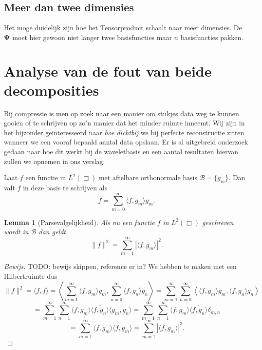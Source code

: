 \documentclass[11pt]{uvamath}
\theoremstyle{plain}
\newtheorem{lemm}[stelling]{Lemma}
\theoremstyle{definition}
\theoremstyle{remark}
\begin{document}
\subsection{Meer dan twee dimensies}
Het moge duidelijk zijn hoe het Tensorproduct schaalt naar meer dimensies. De $\boldsymbol\Psi$ moet hier gewoon niet langer twee basisfuncties maar $n$ basisfuncties pakken. 

\section{Analyse van de fout van beide decomposities}

Bij compressie is men op zoek naar een manier om stukjes data weg te kunnen gooien of te schrijven op zo'n manier dat het minder ruimte inneemt. Wij zijn in het bijzonder ge\"interesseerd naar \emph{hoe dichtbij} we bij perfecte reconstructie zitten wanneer we een vooraf bepaald aantal data opslaan. Er is al uitgebreid onderzoek gedaan naar hoe dit werkt bij de waveletbasis en een aantal resultaten hiervan zullen we opnemen in ons verslag.

Laat $f$ een functie in $L^2(\Box)$ met aftelbare orthonormale basis $\mathcal{B} = \{ g_m \}$. Dan valt $f$ in deze basis te schrijven als
\[
f = \sum_{m = 0}^\infty \langle f, g_m \rangle g_m.
\]

\begin{lemm}[Parsevalgelijkheid\cite{parseval}]
  Als nu een functie $f$ in $L^2(\Box)$ geschreven wordt in $\mathcal{B}$ dan geldt
  \[
  \|f\|^2 = \sum_{m=1}^\infty | \langle f, g_m \rangle |^2.
  \]
\end{lemm}
\begin{proof}[Bewijs]
  TODO: bewijs skippen, reference er in?
  We hebben te maken met een Hilbertruimte dus
  \[
  \|f\|^2 = \langle f, f \rangle = \left\langle \sum_{m=1}^\infty \langle f, g_m \rangle g_m, \sum_{n=0}^\infty \langle f, g_n \rangle g_n \right\rangle = \sum_{m=1}^\infty \sum_{n=0}^\infty \left\langle \langle f, g_m \rangle g_m, \langle f, g_n \rangle g_n \right \rangle
  \]
  \[
  = \sum_{m=1}^\infty \sum_{n=1}^\infty \langle f, g_m \rangle \overline{\langle f, g_n \rangle}\langle g_m, g_n \rangle = \sum_{m=1}^\infty \sum_{n=1}^\infty \langle f, g_m \rangle \overline{\langle f, g_n \rangle} \delta_{m,n}
  \]
  \[ = \sum_{m=1}^\infty \langle f, g_m \rangle \overline{\langle f, g_m \rangle} = \sum_{m=1}^\infty |\langle f, g_m \rangle |^2.
  \]
\end{proof}
\end{document}
